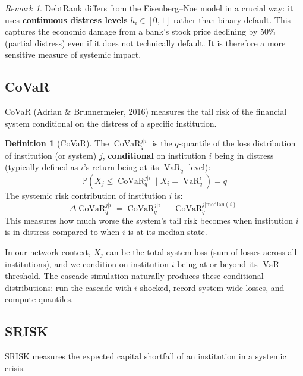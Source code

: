 \documentclass[11pt, a4paper]{article}
\theoremstyle{definition}
\newtheorem{definition}{Definition}[section]
\theoremstyle{plain}
\theoremstyle{remark}
\newtheorem{remark}{Remark}[section]
\newcommand{\VaR}{\operatorname{VaR}}
\newcommand{\CoVaR}{\operatorname{CoVaR}}
\newcommand{\PV}{\mathbb{P}}
\begin{document}
\begin{remark}
DebtRank differs from the Eisenberg--Noe model in a crucial way: it uses
\textbf{continuous distress levels} $h_i \in [0, 1]$ rather than binary default.
This captures the economic damage from a bank's stock price declining by 50\%
(partial distress) even if it does not technically default.
It is therefore a more sensitive measure of systemic impact.
\end{remark}

\subsection{CoVaR}

CoVaR (Adrian \& Brunnermeier, 2016) measures the tail risk of the financial system
conditional on the distress of a specific institution.

\begin{definition}[CoVaR]\label{def:covar}
The $\CoVaR_q^{j|i}$ is the $q$-quantile of the loss distribution of institution
(or system) $j$, \textbf{conditional} on institution $i$ being in distress
(typically defined as $i$'s return being at its $\VaR_q$ level):
\begin{equation}\label{eq:covar}
    \PV\!\left(X_j \leq \CoVaR_q^{j|i} \;\Big|\; X_i = \VaR_q^i\right) = q
\end{equation}
The systemic risk contribution of institution $i$ is:
\begin{equation}\label{eq:delta-covar}
    \Delta\CoVaR_q^{j|i} = \CoVaR_q^{j|i} - \CoVaR_q^{j|\text{median}(i)}
\end{equation}
This measures how much worse the system's tail risk becomes when institution $i$
is in distress compared to when $i$ is at its median state.
\end{definition}

In our network context, $X_j$ can be the total system loss (sum of losses across
all institutions), and we condition on institution $i$ being at or beyond its
$\VaR$ threshold.
The cascade simulation naturally produces these conditional distributions:
run the cascade with $i$ shocked, record system-wide losses, and compute quantiles.

\subsection{SRISK}

SRISK measures the expected capital shortfall of an institution in a systemic crisis.
\end{document}

